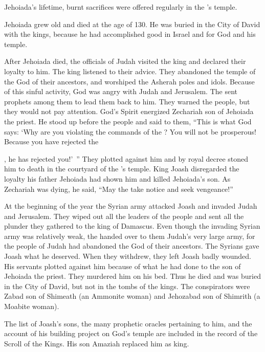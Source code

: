 {Jehoiada’s
lifetime,
burnt sacrifices
were offered regularly
in the
{}’s
temple.
\par }{\PP {}Jehoiada
grew
old
and died
at
the age
of 130.
He was buried
in the City
of David
with
the kings,
because
he had accomplished
good
in Israel
and for God
and his temple.
\par }{\PP {}After
Jehoiada
died,
the officials
of Judah
visited
the king
and declared
their loyalty to him.
The king
listened to their advice.
They abandoned
the temple
of the {}
God
of their ancestors,
and worshiped
the Asherah poles
and idols.
Because of this
sinful activity,
God was angry
with Judah
and Jerusalem.
The
{}
sent
prophets
among them to lead them back
to
him. They warned
the people, but they would not
pay attention.
God’s
Spirit
energized
Zechariah
son
of Jehoiada
the priest.
He stood
up before the people
and said
to them, “This is what
God
says: ‘Why
are you
violating
the commands
of the {}? You will not
be prosperous! Because
you have rejected
the

{}, he has rejected
you!’ ”
They plotted
against
him and by royal
decree
stoned
him to death in the courtyard
of the
{}’s
temple.
King
Joash
disregarded
the loyalty
his father
Jehoiada
had
shown
him
and killed
Jehoiada’s son.
As Zechariah was dying,
he said,
“May
the {}
take notice
and seek vengeance!”
\par }{\PP {}At the beginning
of the year
the Syrian
army
attacked
Joash and invaded
Judah
and Jerusalem.
They wiped out
all
the leaders
of the people
and sent
all
the plunder
they gathered to the king
of Damascus.
Even though
the invading
Syrian
army
was relatively weak,
the {}
handed over
to them Judah’s very
large
army,
for
the people of Judah had abandoned
the {}
God
of their ancestors.
The Syrians gave
Joash
what he deserved.
When
they withdrew,
they left
Joash badly wounded.
His servants
plotted against
him because of what he had done to the son
of Jehoiada
the priest.
They murdered
him on
his bed.
Thus he died
and was buried
in the City
of David,
but not
in the tombs
of the kings.
The conspirators
were
Zabad
son
of Shimeath
(an Ammonite
woman) and Jehozabad
son
of Shimrith
(a Moabite woman).
\par }{\PP {}The list of Joash’s sons,
the many
prophetic oracles
pertaining to him, and the account of his building project
on
God’s
temple
are included
in the record of
the Scroll
of the Kings.
His son
Amaziah
replaced him as king.

}
